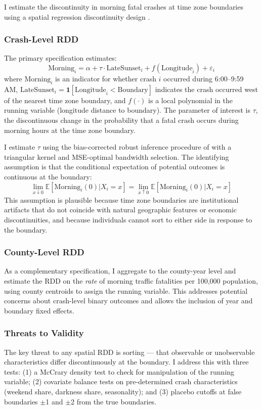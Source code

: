 \documentclass[12pt]{article}
\newcommand{\E}{\mathbb{E}}
\begin{document}
I estimate the discontinuity in morning fatal crashes at time zone boundaries using a spatial regression discontinuity design \citep{calonico2014robust, cattaneo2020practical}.

\subsubsection*{Crash-Level RDD} The primary specification estimates:
\begin{equation}
\text{Morning}_i = \alpha + \tau \cdot \text{LateSunset}_i + f(\text{Longitude}_i) + \varepsilon_i
\label{eq:rdd}
\end{equation}
where $\text{Morning}_i$ is an indicator for whether crash $i$ occurred during 6:00--9:59 AM, $\text{LateSunset}_i = \mathbf{1}[\text{Longitude}_i < \text{Boundary}]$ indicates the crash occurred west of the nearest time zone boundary, and $f(\cdot)$ is a local polynomial in the running variable (longitude distance to boundary). The parameter of interest is $\tau$, the discontinuous change in the probability that a fatal crash occurs during morning hours at the time zone boundary.

I estimate $\tau$ using the bias-corrected robust inference procedure of \citet{calonico2014robust} with a triangular kernel and MSE-optimal bandwidth selection. The identifying assumption is that the conditional expectation of potential outcomes is continuous at the boundary:
\begin{equation}
\lim_{x \downarrow 0} \E[\text{Morning}_i(0) | X_i = x] = \lim_{x \uparrow 0} \E[\text{Morning}_i(0) | X_i = x]
\end{equation}
This assumption is plausible because time zone boundaries are institutional artifacts that do not coincide with natural geographic features or economic discontinuities, and because individuals cannot sort to either side in response to the boundary.

\subsubsection*{County-Level RDD} As a complementary specification, I aggregate to the county-year level and estimate the RDD on the \textit{rate} of morning traffic fatalities per 100,000 population, using county centroids to assign the running variable. This addresses potential concerns about crash-level binary outcomes and allows the inclusion of year and boundary fixed effects.

\subsubsection*{Threats to Validity} The key threat to any spatial RDD is sorting --- that observable or unobservable characteristics differ discontinuously at the boundary. I address this with three tests: (1) a McCrary density test \citep{cattaneo2020density} to check for manipulation of the running variable; (2) covariate balance tests on pre-determined crash characteristics (weekend share, darkness share, seasonality); and (3) placebo cutoffs at false boundaries $\pm$1\textdegree{} and $\pm$2\textdegree{} from the true boundaries.
\end{document}
